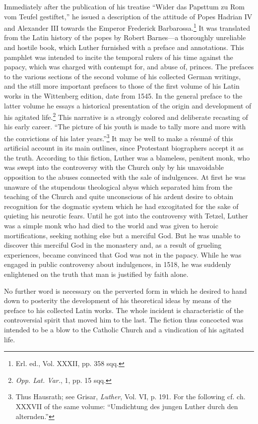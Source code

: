 Immediately after the publication of his treatise “Wider das Papsttum
zu Rom vom Teufel gestiftet,” he issued a description of the
attitude of Popes Hadrian IV and Alexander III towards
the Emperor Frederick Barbarossa.\footnote{Erl. ed., Vol. XXXII, pp. 358 sqq.}
 It was translated from the Latin history
of the popes by Robert Barnes—a thoroughly unreliable and hostile
book, which Luther furnished with a preface and annotations. This
pamphlet was intended to incite the temporal rulers of his time
against the papacy, which was charged with contempt for, and abuse
of, princes. The prefaces to the various sections of the second volume
of his collected German writings, and the still more important prefaces
to those of the first volume of his Latin works in the
Wittenberg edition, date from 1545. In the general preface to the latter
volume he essays a historical presentation of the origin and development
of his agitated life.\footnote{\textit{Opp. Lat. Var.}, 1, pp. 15 sqq.}
 This narrative is a strongly colored and
deliberate recasting of his early career. “The picture of his youth
is made to tally more and more with the convictions of his later
years.”\footnote
{Thus Hausrath; see Grisar, \textit{Luther}, Vol. VI, p. 191. For the following cf. ch. XXXVII
of the same volume: “Umdichtung des jungen Luther durch den alternden.”}
It may be well to make a résumé of this artificial account
in its main outlines, since Protestant biographers accept it as the
truth. According to this fiction, Luther was a blameless, penitent
monk, who was swept into the controversy with the Church only
by his unavoidable opposition to the abuses connected with the sale
of indulgences. At first he was unaware of the stupendous theological
abyss which separated him from the teaching of the Church and quite
unconscious of his ardent desire to obtain recognition for the dogmatic
system which he had excogitated for the sake of quieting his
neurotic fears. Until he got into the controversy with Tetzel, Luther
was a simple monk who had died to the world and was given to heroic
mortifications, seeking nothing else but a merciful God. But he was
unable to discover this merciful God in the monastery and, as a result
of grueling experiences, became convinced that God was not
in the papacy. While he was engaged in public controversy about indulgences,
in 1518, he was suddenly enlightened on the truth that man
is justified by faith alone.

No further word is necessary on the perverted form in which he
desired to hand down to posterity the development of his theoretical
ideas by means of the preface to his collected Latin works. The whole
incident is characteristic of the controversial spirit that moved him
to the last. The fiction thus concocted was intended to be a blow to
the Catholic Church and a vindication of his agitated life.

